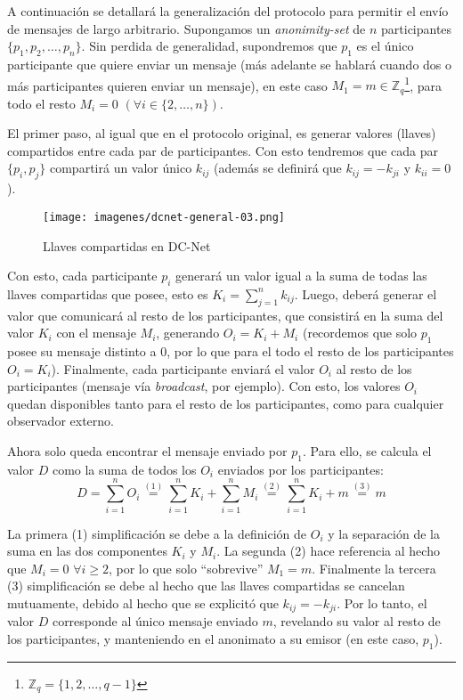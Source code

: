 A continuación se detallará la generalización del protocolo para permitir el envío de mensajes de largo arbitrario. 
Supongamos un \emph{anonimity-set} de $n$ participantes $\{p_1, p_2, \ldots, p_n\}$. Sin perdida de generalidad, supondremos que $p_1$ es el único 
participante que quiere enviar un mensaje (más adelante 
se hablará cuando dos o más participantes quieren enviar un mensaje), 
en este caso $M_1 = m \in \mathbb{Z}_q$\footnote{$\mathbb{Z}_q = \{1, 2, \ldots, q - 1\}$}, para todo el resto $M_i = 0$ $(\forall i \in \{2, \ldots, n\})$.

El primer paso, al igual que en el protocolo original, es generar valores (llaves) compartidos entre cada par de participantes. Con esto 
tendremos que cada par $\{p_i, p_j\}$ compartirá un valor único $k_{ij}$ (además se definirá que $k_{ij} = -k_{ji}$ y $k_{ii} = 0$).

\begin{figure}[H]
  \centering
    \texttt{[image: imagenes/dcnet-general-03.png]}
  \caption{Llaves compartidas en DC-Net}
\end{figure}

Con esto, cada participante $p_i$ generará un valor igual a la suma de todas las llaves compartidas que posee, esto es $K_i = \sum_{j=1}^n k_{ij}$. 
Luego, deberá generar el valor que comunicará al resto de los participantes, que consistirá en la suma del valor $K_i$ con el mensaje $M_i$, 
generando $O_i = K_i + M_i$ (recordemos que solo $p_1$ posee su mensaje distinto a 0, por lo que para el todo el resto de los participantes $O_i = K_i$). 
Finalmente, cada participante enviará el valor $O_i$ al resto de los participantes (mensaje vía \emph{broadcast}, por ejemplo). Con esto, los 
valores $O_i$ quedan disponibles tanto para el resto de los participantes, como para cualquier observador externo.

Ahora solo queda encontrar el mensaje enviado por $p_1$. Para ello, se calcula el valor $D$ como la suma de todos los $O_i$ enviados por los 
participantes: $$D = \sum_{i=1}^n O_i \overset{(1)}{=} \sum_{i=1}^n K_i + \sum_{i=1}^n M_i \overset{(2)}{=} \sum_{i=1}^n K_i + m \overset{(3)}{=} m$$

La primera (1) simplificación se debe a la definición de $O_i$ y la separación de la suma en las dos componentes $K_i$ y $M_i$. La segunda 
(2) hace referencia al hecho que $M_i = 0$ $\forall i \geq 2$, por lo que solo ``sobrevive'' $M_1 = m$. Finalmente la tercera (3) simplificación 
se debe al hecho que las llaves compartidas se cancelan mutuamente, debido al hecho que se explicitó que $k_{ij} = -k_{ji}$. Por lo tanto, el 
valor $D$ corresponde al único mensaje enviado $m$, revelando su valor al resto de los participantes, y manteniendo en el anonimato a su emisor 
(en este caso, $p_1$).

